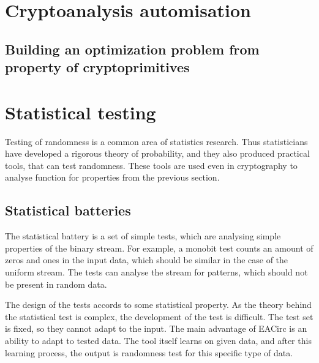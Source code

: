 \documentclass[
  print, %
  Table,   %
  nolof,     %
  nolot,     %
  11pt, %
  oneside  %
]{fithesis3}
\begin{document}
\section{Cryptoanalysis automisation}
\label{sec:cryptoanalysis-automisation}



\subsection[Optimization problem for a cryptoprimitive]{Building an optimization problem from property of cryptoprimitives}
\label{subsec:opti-crypto}


\section{Statistical testing}
\label{sec:stat-testing}


Testing of randomness is a common area of statistics research. Thus statisticians have developed a rigorous theory of probability, and they also produced practical tools, that can test randomness. These tools are used even in cryptography to analyse function for properties from the previous section.

\subsection{Statistical batteries}
\label{subsec:stat-batt}


The statistical battery is a set of simple tests, which are analysing simple properties of the binary stream. For example, a monobit test counts an amount of zeros and ones in the input data, which should be similar in the case of the uniform stream. The tests can analyse the stream for patterns, which should not be present in random data.

The design of the tests accords to some statistical property. As the theory behind the statistical test is complex, the development of the test is difficult. The test set is fixed, so they cannot adapt to the input. The main advantage of EACirc is an ability to adapt to tested data. The tool itself learns on given data, and after this learning process, the output is randomness test for this specific type of data.
\end{document}
